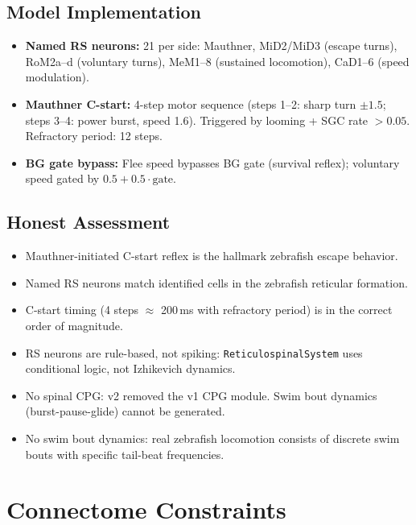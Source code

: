\documentclass[11pt,a4paper]{article}
\begin{document}
\subsection{Model Implementation}

\begin{itemize}[leftmargin=*]
\item \textbf{Named RS neurons:} 21 per side: Mauthner, MiD2/MiD3 (escape turns),
  RoM2a--d (voluntary turns), MeM1--8 (sustained locomotion), CaD1--6 (speed modulation).
\item \textbf{Mauthner C-start:} 4-step motor sequence (steps 1--2: sharp turn
  $\pm 1.5$; steps 3--4: power burst, speed 1.6).  Triggered by looming +
  SGC rate $> 0.05$.  Refractory period: 12 steps.
\item \textbf{BG gate bypass:} Flee speed bypasses BG gate (survival reflex);
  voluntary speed gated by $0.5 + 0.5 \cdot \text{gate}$.
\end{itemize}

\subsection{Honest Assessment}

\begin{itemize}[leftmargin=*]
\item[\textcolor{realistic}{$\checkmark$}] Mauthner-initiated C-start reflex is
  the hallmark zebrafish escape behavior.
\item[\textcolor{realistic}{$\checkmark$}] Named RS neurons match identified cells
  in the zebrafish reticular formation.
\item[\textcolor{realistic}{$\checkmark$}] C-start timing (4 steps $\approx$ 200\,ms
  with refractory period) is in the correct order of magnitude.
\item[\textcolor{missing}{$\times$}] RS neurons are rule-based, not spiking:
  \texttt{ReticulospinalSystem} uses conditional logic, not Izhikevich dynamics.
\item[\textcolor{missing}{$\times$}] No spinal CPG: v2 removed the v1 CPG module.
  Swim bout dynamics (burst-pause-glide) cannot be generated.
\item[\textcolor{missing}{$\times$}] No swim bout dynamics: real zebrafish locomotion
  consists of discrete swim bouts with specific tail-beat frequencies.
\end{itemize}

\section{Connectome Constraints}
\label{sec:connectome}
\end{document}
